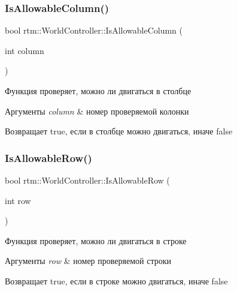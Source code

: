 \subsubsection{\texorpdfstring{Is\+Allowable\+Column()}{IsAllowableColumn()}}
{\footnotesize\ttfamily bool rtm\+::\+World\+Controller\+::\+Is\+Allowable\+Column (\begin{DoxyParamCaption}\item[{int}]{column }\end{DoxyParamCaption})}



Функция проверяет, можно ли двигаться в столбце 


\begin{DoxyParams}{Аргументы}
{\em column} & номер проверяемой колонки \\
\hline
\end{DoxyParams}
\begin{DoxyReturn}{Возвращает}
true, если в столбце можно двигаться, иначе false 
\end{DoxyReturn}
\mbox{\label{classrtm_1_1_world_controller_a0adbbeed573fe3d987c6db2f14e50d21}} 
\subsubsection{\texorpdfstring{Is\+Allowable\+Row()}{IsAllowableRow()}}
{\footnotesize\ttfamily bool rtm\+::\+World\+Controller\+::\+Is\+Allowable\+Row (\begin{DoxyParamCaption}\item[{int}]{row }\end{DoxyParamCaption})}



Функция проверяет, можно ли двигаться в строке 


\begin{DoxyParams}{Аргументы}
{\em row} & номер проверяемой строки \\
\hline
\end{DoxyParams}
\begin{DoxyReturn}{Возвращает}
true, если в строке можно двигаться, иначе false 
\end{DoxyReturn}
\mbox{\label{classrtm_1_1_world_controller_aba0f7dc41fd8b38af0864b05e3c59761}} 
